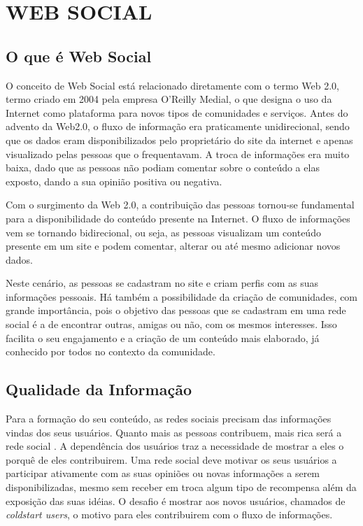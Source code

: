 \chapter{WEB SOCIAL} %
\label{cha:web_social}

\section{O que é Web Social}

O conceito de Web Social está relacionado diretamente com o termo Web 2.0, termo criado em 2004 pela empresa O'Reilly Medial, o que designa o uso da Internet como plataforma para novos tipos de comunidades e serviços. Antes do advento da Web2.0, o fluxo de informação era praticamente unidirecional, sendo que os dados eram disponibilizados pelo proprietário do site da internet e apenas visualizado pelas pessoas que o frequentavam. A troca de informações era muito baixa, dado que as pessoas não podiam comentar sobre o conteúdo a elas exposto, dando a sua opinião positiva ou negativa.

Com o surgimento da Web 2.0, a contribuição das pessoas tornou-se fundamental para a disponibilidade do conteúdo presente na Internet. O fluxo de informações vem se tornando bidirecional, ou seja, as pessoas visualizam um conteúdo presente em um site e podem comentar, alterar ou até mesmo adicionar novos dados.

Neste cenário, as pessoas se cadastram no site e criam perfis com as suas informações pessoais. Há também a possibilidade da criação de comunidades, com grande importância, pois o objetivo das pessoas que se cadastram em uma rede social é a de encontrar outras, amigas ou não, com os mesmos interesses. Isso facilita o seu engajamento e a criação de um conteúdo mais elaborado, já conhecido por todos no contexto da comunidade.

\section{Qualidade da Informação}

Para a formação do seu conteúdo, as redes sociais precisam das informações vindas dos seus usuários. Quanto mais as pessoas contribuem, mais rica será a rede social \cite{burke2009fmm}. A dependência dos usuários traz a necessidade de mostrar a eles o porquê de eles contribuirem. Uma rede social deve motivar os seus usuários a participar ativamente com as suas opiniões ou novas informações a serem disponibilizadas, mesmo sem receber em troca algum tipo de recompensa além da exposição das suas idéias. O desafio é mostrar aos novos usuários, chamados de \textit{coldstart users}, o motivo para eles contribuirem com o fluxo de informações.

